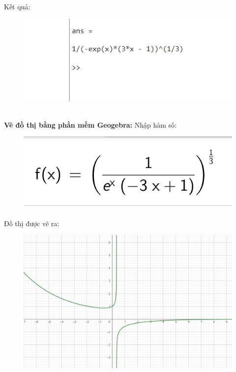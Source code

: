 \documentclass[a4paper,12pt]{report}
\begin{document}
Kết quả:
\begin{figure}[h]
    \centering
    \includegraphics{answer.png}
\end{figure}
\\
\textbf{Vẽ đồ thị bằng phần mềm Geogebra:}
\newpage
Nhập hàm số:
\begin{figure}[h]
    \centering
    \includegraphics [scale = 0.7] {graph_input.png}
\end{figure}

Đồ thị được vẽ ra:
\begin{figure}[ht]
    \centering
    \includegraphics [scale = 0.6] {graph.png} 
\end{figure}
\end{document}
